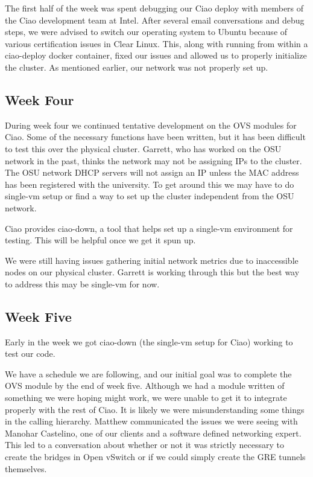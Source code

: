 \documentclass[10pt,onecolumn,journal,draftclsnofoot]{IEEEtran}
\begin{document}
The first half of the week was spent debugging our Ciao deploy with members of
the Ciao development team at Intel. After several email conversations and debug
steps, we were advised to switch our operating system to Ubuntu because of
various certification issues in Clear Linux. This, along with running from
within a ciao-deploy docker container, fixed our issues and allowed us to
properly initialize the cluster. As mentioned earlier, our network was not
properly set up.

\subsection{Week Four}

During week four we continued tentative development on the OVS modules for Ciao.
Some of the necessary functions have been written, but it has been difficult to
test this over the physical cluster. Garrett, who has worked on the OSU network
in the past, thinks the network may not be assigning IPs to the cluster. The OSU
network DHCP servers will not assign an IP unless the MAC address has been
registered with the university. To get around this we may have to do single-vm
setup or find a way to set up the cluster independent from the OSU network.

Ciao provides ciao-down, a tool that helps set up a single-vm environment for
testing. This will be helpful once we get it spun up.

We were still having issues gathering initial network metrics due to inaccessible
nodes on our physical cluster. Garrett is working through this but the best way
to address this may be single-vm for now.

\subsection{Week Five}

Early in the week we got ciao-down (the single-vm setup for Ciao) working to
test our code.

We have a schedule we are following, and our initial goal was to complete the
OVS module by the end of week five. Although we had a module written of
something we were hoping might work, we were unable to get it to integrate
properly with the rest of Ciao.  It is likely we were misunderstanding some
things in the calling hierarchy.  Matthew communicated the issues we were seeing
with Manohar Castelino, one of our clients and a software defined networking
expert. This led to a conversation about whether or not it was strictly
necessary to create the bridges in Open vSwitch or if we could simply create the
GRE tunnels themselves.
\end{document}
